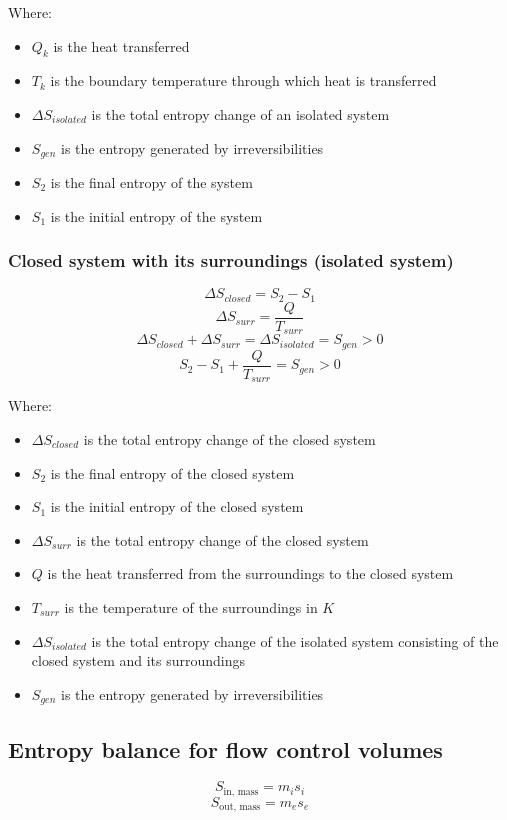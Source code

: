 \documentclass[11pt]{article}
\begin{document}
Where:
\begin{itemize}
\item \(Q_k\) is the heat transferred
\item \(T_k\) is the boundary temperature through which heat is transferred
\item \(\Delta S_{isolated}\) is the total entropy change of an isolated system
\item \(S_{gen}\) is the entropy generated by irreversibilities
\item \(S_2\) is the final entropy of the system
\item \(S_1\) is the initial entropy of the system
\end{itemize}

\subsubsection{Closed system with its surroundings (isolated system)}
\label{sec:orgd307f45}
\[\Delta S_{closed} = S_2 - S_1\]
\[\Delta S_{surr} = \frac{Q}{T_{surr}}\]
\[\Delta S_{closed} + \Delta S_{surr} = \Delta S_{isolated} = S_{gen} > 0\]
\[S_2 - S_1 + \frac{Q}{T_{surr}} = S_{gen} > 0\]

Where:
\begin{itemize}
\item \(\Delta S_{closed}\) is the total entropy change of the closed system
\item \(S_2\) is the final entropy of the closed system
\item \(S_1\) is the initial entropy of the closed system
\item \(\Delta S_{surr}\) is the total entropy change of the closed system
\item \(Q\) is the heat transferred from the surroundings to the closed system
\item \(T_{surr}\) is the temperature of the surroundings in \(\unit{K}\)
\item \(\Delta S_{isolated}\) is the total entropy change of the isolated system consisting of the closed system and its surroundings
\item \(S_{gen}\) is the entropy generated by irreversibilities
\end{itemize}

 \newpage

\subsection{Entropy balance for flow control volumes}
\label{sec:org7826648}
\[S_{\text{in, mass}} = m_i s_i\]
\[S_{\text{out, mass}} = m_e s_e\]
\end{document}
